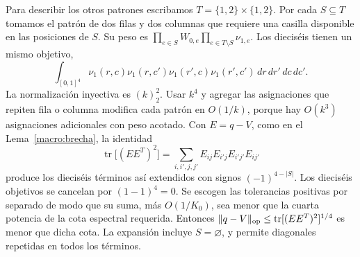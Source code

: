 Para describir los otros patrones escribamos $T=\{1,2\}\times\{1,2\}$. Por cada $S\subseteq T$ tomamos
el patrón de dos filas y dos columnas que requiere una casilla disponible en las posiciones de $S$. Su
peso es $\prod_{e\in S}W_{0,e}\prod_{e\in T\setminus S}\nu_{1,e}$. Los dieciséis tienen un mismo
objetivo,
\[
 \int_{[0,1]^4}\nu_1(r,c)\nu_1(r,c')\nu_1(r',c)\nu_1(r',c')\,dr\,dr'\,dc\,dc' .
\]
La normalización inyectiva es $(k)_2^2$. Usar $k^4$ y agregar las asignaciones que repiten fila o
columna modifica cada patrón en $O(1/k)$, porque hay $O(k^3)$ asignaciones adicionales con peso
acotado. Con $E=q-V$, como en el Lema~\ref{macro:brecha}, la identidad
\[
 \operatorname{tr}\big[(EE^{T})^2\big]
 =\sum_{i,i',j,j'} E_{ij}E_{i'j}E_{i'j'}E_{ij'}
\]
produce los dieciséis términos así extendidos con signos $(-1)^{4-|S|}$. Los dieciséis objetivos se
cancelan por $(1-1)^4=0$. Se escogen las tolerancias positivas por separado de modo que su suma, más
$O(1/K_0)$, sea menor que la cuarta potencia de la cota espectral requerida. Entonces $\|q-V\|_{\rm
op}\le\operatorname{tr}[(EE^T)^2]^{1/4}$ es menor que dicha cota. La expansión incluye
$S=\varnothing$, y permite diagonales repetidas en todos los términos.
